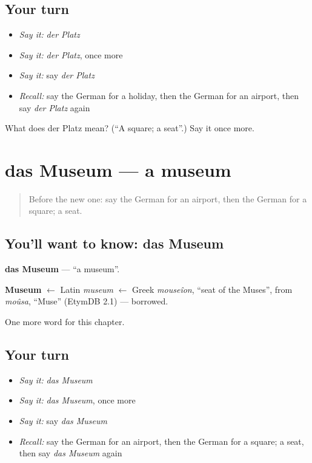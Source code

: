 \subsection*{Your turn}
\begin{itemize}
\raggedright
  \item \emph{Say it:} \emph{der Platz}
  \item \emph{Say it:} \emph{der Platz}, once more
  \item \emph{Say it:} say \emph{der Platz}
  \item \emph{Recall:} say the German for a holiday, then the German for an airport, then say \emph{der Platz} again
\end{itemize}

\begin{tcolorbox}[breakable,colback=teal!4,colframe=teal!35!black,title={Before you move on}]
What does der Platz mean? (\textquotedblleft{}A square; a seat\textquotedblright{}.) Say it once more.
\end{tcolorbox}
\section[das Museum]{das Museum — a museum}

\label{lesson:GE-C104-museum}



\begin{quote}
Before the new one: say the German for an airport, then the German for a square; a seat.
\end{quote}

\subsection*{You'll want to know: das Museum}
\textbf{das Museum} — \textquotedblleft{}a museum\textquotedblright{}.

\begin{cousinweb}
\textbf{Museum} $\leftarrow$ Latin \emph{museum} $\leftarrow$ Greek \emph{mouseîon}, \textquotedblleft{}seat of the Muses\textquotedblright{}, from \emph{moûsa}, \textquotedblleft{}Muse\textquotedblright{} (EtymDB 2.1) — borrowed.
\end{cousinweb}

\begin{grammarlens}[title={What you've built}]
One more word for this chapter.
\end{grammarlens}

\subsection*{Your turn}
\begin{itemize}
\raggedright
  \item \emph{Say it:} \emph{das Museum}
  \item \emph{Say it:} \emph{das Museum}, once more
  \item \emph{Say it:} say \emph{das Museum}
  \item \emph{Recall:} say the German for an airport, then the German for a square; a seat, then say \emph{das Museum} again
\end{itemize}

